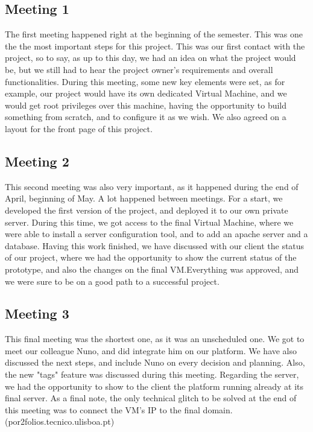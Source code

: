 \documentclass[a4paper,12pt,journal,twoside,compsoc]{PPIEEEtran}
\begin{document}
\subsection{Meeting 1}

The first meeting happened right at the beginning of the semester. This was one the the most important steps for this project. This was our first contact with the project, so to say, as up to this day, we had an idea on what the project would be, but we still had to hear the project owner's requirements and overall functionalities. During this meeting, some new key elements were set, as for example, our project would have its own dedicated Virtual Machine, and we would get root privileges over this machine, having the opportunity to build something from scratch, and to configure it as we wish.
	We also agreed on a layout for the front page of this project.
	
\subsection{Meeting 2}

This second meeting was also very important, as it happened during the end of April, beginning of May. A lot happened between meetings. For a start, we developed the first version of the project, and deployed it to our own private server. During this time, we got access to the final Virtual Machine, where we were able to install a server configuration tool, and to add an apache server and a database.
Having this work finished, we have discussed with our client the status of our project, where we had the opportunity to show the current status of the prototype, and also the changes on the final VM.Everything was approved, and we were sure to be on a good path to a successful project.

\subsection{Meeting 3}

	This final meeting was the shortest one, as it was an unscheduled one. We got to meet our colleague Nuno, and did integrate him on our platform. We have also discussed the next steps, and include Nuno on every decision and planning. Also, the new "tags" feature was discussed during this meeting.
	Regarding the server, we had the opportunity to show to the client the platform running already at its final server.
	As a final note, the only technical glitch to be solved at the end of this meeting was to connect the VM's IP to the final domain.
	(por2folios.tecnico.ulisboa.pt)
\end{document}
